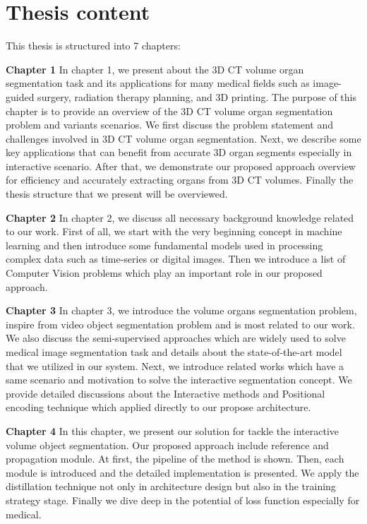 \section{Thesis content}
\label{sec:thesis_content}

This thesis is structured into 7 chapters:

\textbf{Chapter 1}
In chapter 1, we present about the 3D CT volume organ segmentation task and its applications for many medical fields such as image-guided surgery, radiation therapy planning, and 3D printing. The purpose of this chapter is to provide an overview of the 3D CT volume organ segmentation problem and variants scenarios. We first discuss the problem statement and challenges involved in 3D CT volume organ segmentation. Next, we describe some key applications that can benefit from accurate 3D organ segments especially in interactive scenario. After that, we demonstrate our proposed approach overview for efficiency and accurately extracting organs from 3D CT volumes. Finally the thesis structure that we present will be overviewed.

\textbf{Chapter 2}
In chapter 2, we discuss all necessary background knowledge related to our work. First of all, we start with the very beginning concept in machine learning and then introduce some fundamental models used in processing complex data such as time-series or digital images. Then we introduce a list of Computer Vision problems which play an important role in our proposed approach. 

\textbf{Chapter 3}
In chapter 3, we introduce the volume organs segmentation problem, inspire from video object segmentation problem and is most related to our work. We also discuss the semi-supervised approaches which are widely used to solve medical image segmentation task and details about the state-of-the-art model that we utilized in our system. Next, we introduce related works which have a same scenario and motivation to solve the interactive segmentation concept. We provide detailed discussions about the Interactive methods and Positional encoding technique which applied directly to our propose architecture.

\textbf{Chapter 4}
In this chapter, we present our solution for tackle the interactive volume object segmentation. Our proposed approach include reference and propagation module. At first, the pipeline of the method is shown. Then, each module is introduced and the detailed implementation is presented. We apply the distillation technique not only in architecture design but also in the training strategy stage. Finally we dive deep in the potential of loss function especially for medical.


